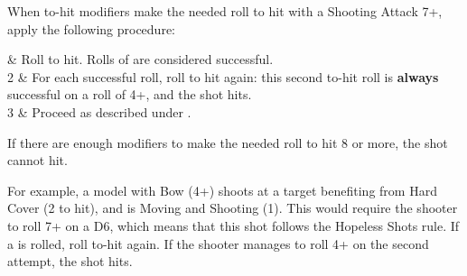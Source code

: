 When to-hit modifiers make the needed roll to hit with a Shooting Attack 7+, apply the following procedure:

 & Roll to hit. Rolls of  are considered successful.\\
	2 & For each successful roll, roll to hit again: this second to-hit roll is \textbf{always} successful on a roll of 4+, and the shot hits.\\
	3 & Proceed as described under .\\
\closeseqtablemc

If there are enough modifiers to make the needed roll to hit 8 or more, the shot cannot hit.

For example, a model with Bow (4+) shoots at a target benefiting from Hard Cover (\minuss{}2 to hit), and is Moving and Shooting (\minuss{}1). This would require the shooter to roll 7+ on a D6, which means that this shot follows the Hopeless Shots rule. If a  is rolled, roll to-hit again. If the shooter manages to roll 4+ on the second attempt, the shot hits.

\RBemc

\newcommand{\figureSCA}{a)}
\newcommand{\figureSCB}{b)}
\newcommand{\figureSCC}{c)}
\newcommand{\figureHCSizeGreen}{\normalfontsize{Height: Standard}}
\newcommand{\figureHCSizeBlue}{\normalfontsize{Height: Standard}}
\newcommand{\figureHCSizePurple}{\normalfontsize{Height: Standard}}
\newcommand{\figureHCNotwithinlightofsight}{%
	\begin{minipage}{0.08\unitlength}\begin{center}%
		\smallfontsize{Not within Line of Sight}%
	\end{center}\end{minipage}%
}
\newcommand{\figureHCWithinlightofsight}{\smallfontsize{Within Line of Sight}}
\newcommand{\figureHCLessthanhalfoffootprintobscured}{%
	\begin{minipage}{0.08\unitlength}\begin{center}%
		\smallfontsize{Less than half of the Target Facing is obscured}%
	\end{center}\end{minipage}%
}
\newcommand{\figureHCMorethanhalfoffootprintobscured}{%
	\begin{minipage}{0.08\unitlength}\begin{center}%
		\smallfontsize{More than half of the Target Facing is obscured}%
	\end{center}\end{minipage}%
}

